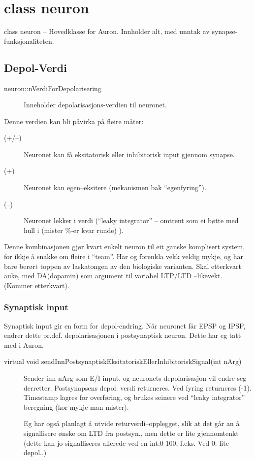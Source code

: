 
\chapter{class neuron}

class neuron -- Hovedklasse for Auron. Innholder alt, med unntak av synapse-funksjonaliteten.

\section{Depol-Verdi}
\label{depolVerdi}
\begin{description}\item[neuron::nVerdiForDepolarisering] Inneholder depolarisasjons-verdien til neuronet.\end{description}
Denne verdien kan bli påvirka på fleire måter:
\begin{description}
	\item[(+/--)] Neuronet kan få eksitatorisk eller inhibitorisk input gjennom synapse.
	\item[ (+) ] Neuronet kan egen--eksitere (mekanismen bak ``egenfyring'').
	\item[ (--) ] Neuronet lekker i verdi (``leaky integrator'' -- omtrent som ei bøtte med hull i (mister \%-er kvar runde) ).
\end{description}
Denne kombinasjonen gjør kvart enkelt neuron til eit ganske komplisert system, for ikkje å snakke om fleire i ``team''. Har og forenkla vekk veldig mykje, og har bare berørt toppen av laskatongen av den biologiske varianten. Skal etterkvart auke, med DA(dopamin) som argument til variabel LTP/LTD --likevekt. (Kommer etterkvart).

\subsection{Synaptisk input}
Synaptisk input gir en form for depol-endring.
Når neuronet får EPSP og IPSP, endrer dette pr.def. depolarisasjonen i postsynaptisk neuron. Dette har eg tatt med i Auron.
\begin{description}\item[virtual void sendInnPostsynaptiskEksitatoriskEllerInhibitoriskSignal(int nArg)] 
	Sender inn nArg som E/I input, og neuronets depolarisasjon vil endre seg derretter. Postsynapsens depol. verdi returneres. Ved fyring returneres (-1).
	Timestamp lagres for overføring, og brukes seinere ved ``leaky integrator'' beregning (kor mykje man mister).
	
	Eg har også planlagt å utvide returverdi--opplegget, slik at det går an å signallisere ønske om LTD fra postsyn., men dette er lite gjennomtenkt (dette kan jo signalliseres allerede ved en int:0-100, f.eks. Ved 0: lite depol..)
\end{description}

